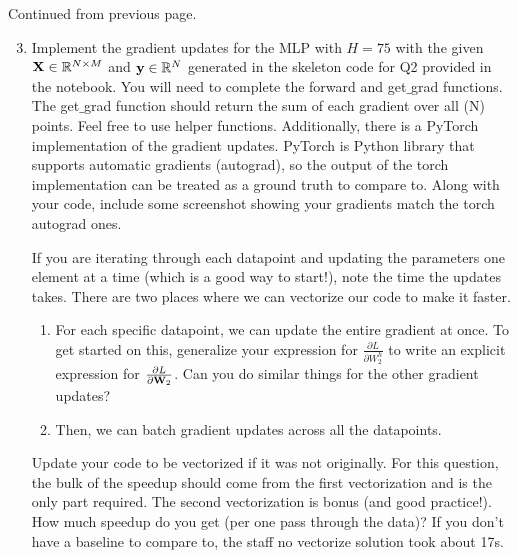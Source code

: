 \documentclass[submit]{harvardml}
\begin{document}
    \begin{problem}
     Continued from previous page.
     
    \begin{enumerate}
     \setcounter{enumi}{2}
    
    \item Implement the gradient updates for the MLP with $H = 75$ with the given $\bold{X} \in \mathbb{R}^{N \times M}$ and $\bold{y} \in \mathbb{R}^N$ generated in the skeleton code for Q2 provided in the notebook. You will need to complete the forward and get$\_$grad functions. The get$\_$grad function should return the sum of each gradient over all (N) points. Feel free to use helper functions. Additionally, there is a PyTorch implementation of the gradient updates. PyTorch is Python library that supports automatic gradients (autograd), so the output of the torch implementation can be treated as a ground truth to compare to. Along with your code, include some screenshot showing your gradients match the torch autograd ones.
    
    If you are iterating through each datapoint and updating the parameters one element at a time (which is a good way to start!), note the time the updates takes. There are two places where we can vectorize our code to make it faster.
    \begin{enumerate}
        \item For each specific datapoint, we can update the entire gradient at once.  To get started on this, generalize your expression for $\frac{\partial L}{\partial W_2^h}$ to write an explicit expression for $\frac{\partial L}{\partial \bold{W}_2}$. Can you do similar things for the other gradient updates? 
        
        \item Then, we can batch gradient updates across all the datapoints.
    \end{enumerate}
    
    Update your code to be vectorized if it was not originally. For this question, the bulk of the speedup should come from the first vectorization and is the only part required. The second vectorization is bonus (and good practice!). How much speedup do you get (per one pass through the data)? If you don't have a baseline to compare to, the staff no vectorize solution took about 17s.
  
\end{enumerate}

\end{problem}
\end{document}
